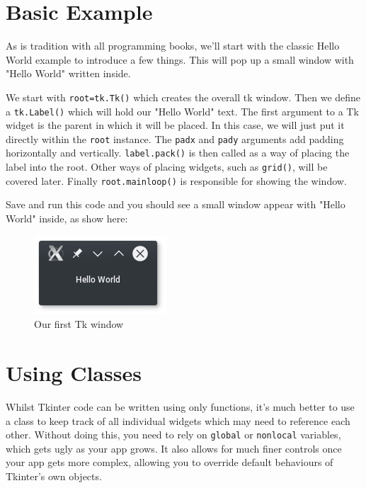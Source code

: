 \documentclass[a4paper,11pt,openany]{book}
\begin{document}
\section{Basic Example}
As is tradition with all programming books, we'll start with the classic Hello World example to introduce a few things. This will pop up a small window with "Hello World" written inside.

\lstset{style=pystyle}


We start with \lstinline[columns=fixed]{root=tk.Tk()} which creates the overall tk window.
Then we define a \lstinline[columns=fixed]{tk.Label()} which will hold our "Hello World" text. The first argument to a Tk widget is the parent in which it will be placed. In this case, we will just put it directly within the \lstinline[columns=fixed]{root} instance.
The \lstinline[columns=fixed]{padx} and \lstinline[columns=fixed]{pady} arguments add padding horizontally and vertically.
\lstinline[columns=fixed]{label.pack()} is then called as a way of placing the label into the root. Other ways of placing widgets, such as \lstinline[columns=fixed]{grid()}, will be covered later.
Finally \lstinline[columns=fixed]{root.mainloop()} is responsible for showing the window.

\vspace{5mm}

Save and run this code and you should see a small window appear with "Hello World" inside, as show here:
\begin{figure}[h]
\centering
\includegraphics{Ch1-1}
\caption{Our first Tk window}
\end{figure}

\newpage
\section{Using Classes}
Whilst Tkinter code can be written using only functions, it's much better to use a class to keep track of all individual widgets which may need to reference each other. Without doing this, you need to rely on \lstinline[columns=fixed]{global} or \lstinline[columns=fixed]{nonlocal} variables, which gets ugly as your app grows. It also allows for much finer controls once your app gets more complex, allowing you to override default behaviours of Tkinter's own objects.
\end{document}

